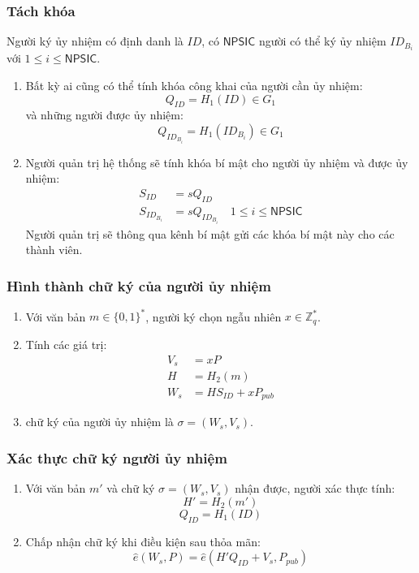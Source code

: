 \subsubsection{Tách khóa}

Người ký ủy nhiệm có định danh là $ID$, có $\mathsf{NPSIC}$ người có thể ký ủy nhiệm $ID_{B_i}$ với $1\le i \le \mathsf{NPSIC}$.
\begin{enumerate}[label=(\arabic*)]
	\item Bất kỳ ai cũng có thể tính khóa công khai của người cần ủy nhiệm: 
	\[ Q_{ID} = H_1(ID) \in G_1 \] và những người được ủy nhiệm: \[ Q_{ID_{B_i}} = H_1(ID_{B_i}) \in G_1 \]
	\item Người quản trị hệ thống sẽ tính khóa bí mật cho người ủy nhiệm và được ủy nhiệm:
	\begin{align*}
		S_{ID} &= sQ_{ID} \\
		S_{ID_{B_i}} &= sQ_{ID_{B_i}} \quad 1\le i \le \mathsf{NPSIC}
	\end{align*}
	Người quản trị sẽ thông qua kênh bí mật gửi các khóa bí mật này cho các thành viên.
\end{enumerate}

\subsubsection{Hình thành chữ ký của người ủy nhiệm}

\begin{enumerate}[label=(\arabic*)]
	\item Với văn bản $m \in \{0,1\}^*$, người ký chọn ngẫu nhiên $x \in \mathbb{Z}_q^*$.
	\item Tính các giá trị:
	\begin{align*}
	V_s &= xP\\
	H &=H_2(m) \\
	W_s &= HS_{ID} + xP_{pub}
	\end{align*}
	\item chữ ký của người ủy nhiệm là $\sigma = (W_s,V_s)$.
\end{enumerate}	

\subsubsection{Xác thực chữ ký người ủy nhiệm}

\begin{enumerate}[label=(\arabic*)]
	\item Với văn bản $m'$ và chữ ký $\sigma = (W_s,V_s)$ nhận được, người xác thực tính: 
	 \[ H'=H_2(m') \]  \[ Q_{ID} = H_1(ID) \]
	\item Chấp nhận chữ ký khi điều kiện sau thỏa mãn:
	\begin{equation}
	\hat{e}(W_s,P) = \hat{e}(H'Q_{ID} + V_s,P_{pub})
	\end{equation}
\end{enumerate}

